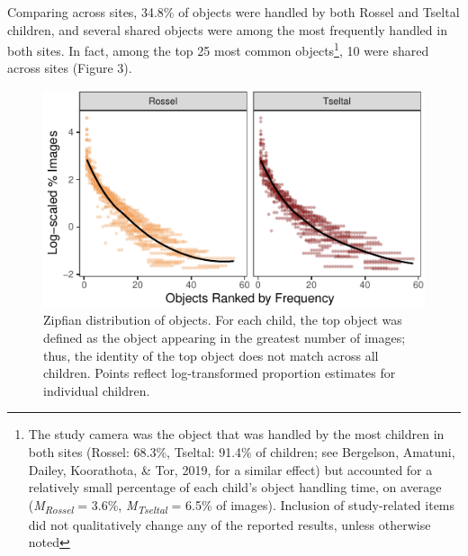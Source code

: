 \documentclass[10pt, letterpaper]{article}
\newenvironment{CodeChunk}{}{}
\begin{document}
Comparing across sites, 34.8\% of objects were handled by both Rossel
and Tseltal children, and several shared objects were among the most
frequently handled in both sites. In fact, among the top 25 most common
objects\footnote{The study camera was the object that was handled by the
  most children in both sites (Rossel: 68.3\%, Tseltal: 91.4\% of
  children; see Bergelson, Amatuni, Dailey, Koorathota, \& Tor, 2019,
  for a similar effect) but accounted for a relatively small percentage
  of each child's object handling time, on average
  (\emph{M}\textsubscript{\emph{Rossel}} = 3.6\%,
  \emph{M}\textsubscript{\emph{Tseltal}} = 6.5\% of images). Inclusion
  of study-related items did not qualitatively change any of the
  reported results, unless otherwise noted}, 10 were shared across sites
(Figure 3).

\begin{CodeChunk}
\begin{figure}[h]

{\centering \includegraphics{figs/zipfian-objects-fig-1} 

}

\caption[Zipfian distribution of objects]{Zipfian distribution of objects. For each child, the top object was defined as the object appearing in the greatest number of images; thus, the identity of the top object does not match across all children. Points reflect log-transformed proportion estimates for individual children.}\label{fig:zipfian-objects-fig}
\end{figure}
\end{CodeChunk}
\end{document}
